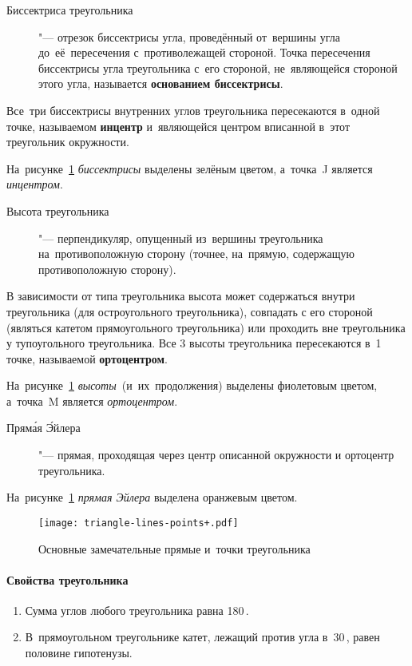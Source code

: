 \documentclass[]{scrartcl}
\begin{document}
\begin{description}
	\item[Биссектриса треугольника] "--- отрезок биссектрисы угла, проведённый от~вершины угла до~её~пересечения с~противолежащей стороной. Точка пересечения биссектрисы угла треугольника с~его стороной, не~являющейся стороной этого угла, называется \textbf{основанием биссектрисы}.
\end{description}

Все~три биссектрисы внутренних углов треугольника пересекаются в~одной точке, называемом \textbf{инцентр} и~являющейся центром вписанной в~этот треугольник окружности.

На~рисунке~\ref{fig:triangle-lines-points} \emph{биссектрисы} выделены зелёным цветом, а~точка~J является \emph{инцентром}.

\begin{description}
	\item[Высота треугольника] "--- перпендикуляр, опущенный из~вершины треугольника на~противоположную сторону (точнее, на~прямую, содержащую противоположную сторону).
\end{description}
В зависимости от типа треугольника высота может содержаться внутри треугольника (для остроугольного треугольника), совпадать с его стороной (являться катетом прямоугольного треугольника) или проходить вне треугольника у тупоугольного треугольника. Все 3 высоты треугольника пересекаются в~1 точке, называемой \textbf{ортоцентром}.

На~рисунке~\ref{fig:triangle-lines-points} \emph{высоты}~(и~их~продолжения) выделены фиолетовым цветом, а~точка~M является \emph{ортоцентром}.

\begin{description}
	\item[Пряма́я Э́йлера] "--- прямая, проходящая через центр описанной окружности и ортоцентр треугольника.
\end{description}

На~рисунке~\ref{fig:triangle-lines-points} \emph{прямая Эйлера}  выделена оранжевым цветом.

\begin{figure}[ht]
	\centering %
	\texttt{[image: triangle-lines-points+.pdf]}
	\caption{Основные замечательные прямые и~точки треугольника}\label{fig:triangle-lines-points}
\end{figure} 

\paragraph{Свойства треугольника}
\begin{enumerate}
	\item Сумма углов любого треугольника равна 180\,\textdegree.
	\item В~прямоугольном треугольнике катет, лежащий против угла в~30\,\textdegree, равен половине гипотенузы.
\end{enumerate}
\end{document}
